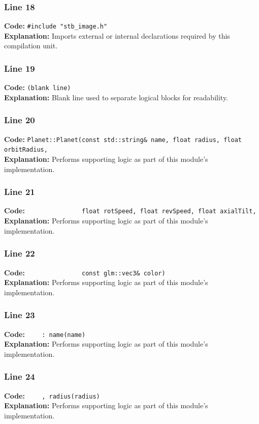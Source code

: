 \documentclass[11pt,a4paper]{article}
\begin{document}
\subsubsection*{Line 18}
\textbf{Code:} \verb|#include "stb_image.h"|\\
\textbf{Explanation:} Imports external or internal declarations required by this compilation unit.

\subsubsection*{Line 19}
\textbf{Code:} \texttt{(blank line)}\\
\textbf{Explanation:} Blank line used to separate logical blocks for readability.

\subsubsection*{Line 20}
\textbf{Code:} \verb|Planet::Planet(const std::string& name, float radius, float orbitRadius,|\\
\textbf{Explanation:} Performs supporting logic as part of this module's implementation.

\subsubsection*{Line 21}
\textbf{Code:} \verb|               float rotSpeed, float revSpeed, float axialTilt,|\\
\textbf{Explanation:} Performs supporting logic as part of this module's implementation.

\subsubsection*{Line 22}
\textbf{Code:} \verb|               const glm::vec3& color)|\\
\textbf{Explanation:} Performs supporting logic as part of this module's implementation.

\subsubsection*{Line 23}
\textbf{Code:} \verb|    : name(name)|\\
\textbf{Explanation:} Performs supporting logic as part of this module's implementation.

\subsubsection*{Line 24}
\textbf{Code:} \verb|    , radius(radius)|\\
\textbf{Explanation:} Performs supporting logic as part of this module's implementation.
\end{document}
